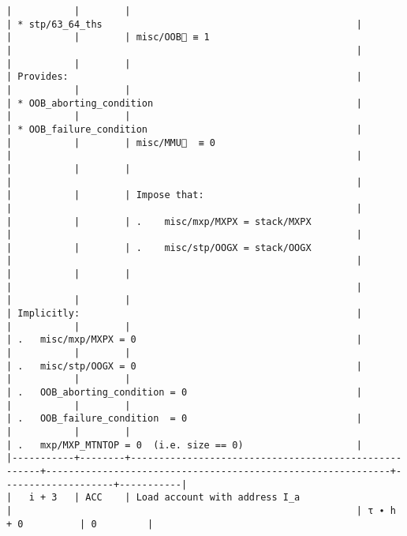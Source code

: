 \documentclass[varwidth=\maxdimen,margin=0.5cm,multi={verbatim}]{standalone}
\begin{document}
\begin{verbatim}
|           |        |                                                      | * stp/63_64_ths                                             |
|           |        | misc/OOB🚩 ≡ 1                                       |                                                             |
|           |        |                                                      | Provides:                                                   |
|           |        |                                                      | * OOB_aborting_condition                                    |
|           |        |                                                      | * OOB_failure_condition                                     |
|           |        | misc/MMU🚩  ≡ 0                                      |                                                             |
|           |        |                                                      |                                                             |
|           |        | Impose that:                                         |                                                             |
|           |        | .    misc/mxp/MXPX = stack/MXPX                      |                                                             |
|           |        | .    misc/stp/OOGX = stack/OOGX                      |                                                             |
|           |        |                                                      |                                                             |
|           |        |                                                      | Implicitly:                                                 |
|           |        |                                                      | .   misc/mxp/MXPX = 0                                       |
|           |        |                                                      | .   misc/stp/OOGX = 0                                       |
|           |        |                                                      | .   OOB_aborting_condition = 0                              |
|           |        |                                                      | .   OOB_failure_condition  = 0                              |
|           |        |                                                      | .   mxp/MXP_MTNTOP = 0  (i.e. size == 0)                    |
|-----------+--------+------------------------------------------------------+-------------------------------------------------------------+--------------------+-----------|
|   i + 3   | ACC    | Load account with address I_a                        |                                                             | τ ∙ h + 0          | 0         |

\end{verbatim}
\end{document}
